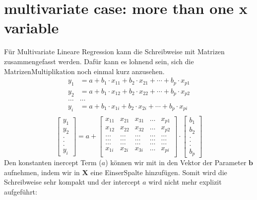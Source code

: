 \documentclass[letterpaper,10pt,english]{jupyterBook}
\begin{document}
\chapter{multivariate case: more than one x variable}
\label{\detokenize{Regression_Techniques:multivariate-case-more-than-one-x-variable}}
\sphinxAtStartPar
Für Multivariate Lineare Regression kann die Schreibweise mit Matrizen zusammengefasst werden. Dafür kann es lohnend sein, sich die Matrizen\sphinxhyphen{}Multiplikation noch einmal kurz anzusehen.
\begin{align*}
    y_1&=a+b_1\cdot x_{11}+b_2\cdot x_{21}+\cdots + b_p\cdot x_{p1}\\
    y_2&=a+b_1\cdot x_{12}+b_2\cdot x_{22}+\cdots + b_p\cdot x_{p2}\\
    \ldots& \ldots\\
    y_i&=a+b_1\cdot x_{1i}+b_2\cdot x_{2i}+\cdots + b_p\cdot x_{pi}\\
\end{align*}\begin{equation*}
    \begin{bmatrix}
      y_1\\
      y_2\\
      .  \\
      .  \\
      .  \\
      y_i
    \end{bmatrix}
    = a+
    \begin{bmatrix}
      x_{11} & x_{21} & x_{31} & \ldots & x_{p1}\\
      x_{12} & x_{22} & x_{32} & \ldots & x_{p2}\\
      \ldots&\ldots&\ldots&\ldots&\ldots\\
      \ldots&\ldots&\ldots&\ldots&\ldots\\
      \ldots&\ldots&\ldots&\ldots&\ldots\\
      x_{1i} & x_{2i} & x_{3i} & \ldots & x_{pi}\\
    \end{bmatrix}
    \cdot
    \begin{bmatrix}
 b_1\\
      b_2\\
      .\\
      .\\
      .\\
      b_p
    \end{bmatrix}
\end{equation*}
\sphinxAtStartPar
Den konstanten inercept Term (\(a\)) können wir mit in den Vektor der Parameter \(\mathbf{b}\) aufnehmen, indem wir in \(\mathbf{X}\) eine Einser\sphinxhyphen{}Spalte hinzufügen. Somit wird die Schreibweise sehr kompakt und der intercept \(a\) wird nicht mehr explizit aufgeführt:
\end{document}
